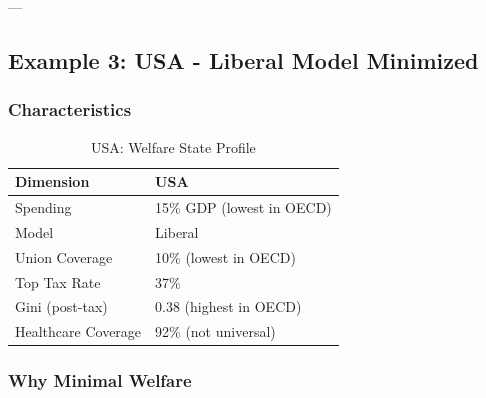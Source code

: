 ---

\subsection{Example 3: USA - Liberal Model Minimized}

\subsubsection{Characteristics}

\begin{table}[h]
\centering
\caption{USA: Welfare State Profile}
\label{tab:usa-profile}
\begin{tabular}{ll}
\toprule
\textbf{Dimension} & \textbf{USA} \\
\midrule
Spending & 15\% GDP (lowest in OECD) \\
Model & Liberal \\
Union Coverage & 10\% (lowest in OECD) \\
Top Tax Rate & 37\% \\
Gini (post-tax) & 0.38 (highest in OECD) \\
Healthcare Coverage & 92\% (not universal) \\
\bottomrule
\end{tabular}
\end{table}

\subsubsection{Why Minimal Welfare}

